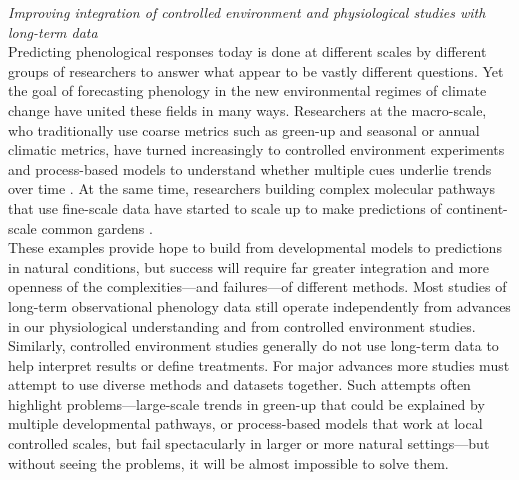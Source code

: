\documentclass[11pt,letter]{article}
\newcommand{\R}[1]{\label{#1}\linelabel{#1}}
\begin{document}
\emph{Improving integration of controlled environment and physiological studies with long-term data}\\
\R{r2acrosscalesstart}Predicting phenological responses today is done at different scales by different groups of researchers to answer what appear to be vastly different questions. Yet the goal of forecasting phenology in the new environmental regimes of climate change have united these fields in many ways. Researchers at the macro-scale, who traditionally use coarse metrics such as green-up and seasonal or annual climatic metrics, have turned increasingly to controlled environment experiments and process-based models to understand whether multiple cues underlie trends over time \citep[e.g.,][]{fu2019}. At the same time, researchers building complex molecular pathways that use fine-scale data have started to scale up to make predictions of continent-scale common gardens \citep{Wilczek:2009oa}.\\

These examples provide hope to build from developmental models to predictions in natural conditions, but success will require far greater integration and more openness of the complexities---and failures---of different methods. Most studies of long-term observational phenology data still operate independently from advances in our physiological understanding and from controlled environment studies. Similarly, controlled environment studies generally do not use long-term data to help interpret results or define treatments. For major advances more studies must attempt to use diverse methods and datasets together. Such attempts often highlight problems---large-scale trends in green-up that could be explained by multiple developmental pathways, or process-based models that work at local controlled scales, but fail spectacularly in larger or more natural settings---but without seeing the problems, it will be almost impossible to solve them.\R{r2acrosscalesend}\\
\end{document}

